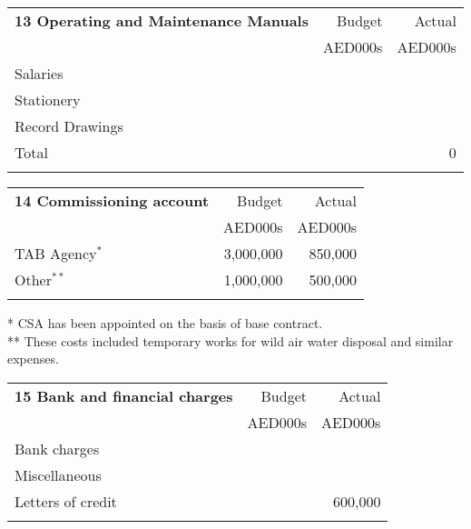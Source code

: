 \documentclass[oneside]{scrbook}
\makeatletter
\def\dotfill{%
\color{spot!50}%
\leavevmode
\cleaders \hb@xt@ 4pt{\hss \resizebox{1.5pt}{!}{\char"25CF}\relax\hss}\hfill
\kern\z@}%
\newcommand{\DotRow}[2]{%
\hbox to \columnwidth{\rule[-3pt]{0pt}{6pt}\dotfill}\break
}
\makeatother
\begin{document}
\begin{tabularx}{\linewidth}{Xrr}
\textbf{13 Operating and Maintenance Manuals }                                            &Budget   &Actual\\
                                                                               &AED000s &AED000s\\
\noalign{\DotRow{}{}} 
Salaries  &&\\
Stationery &&\\
Record Drawings &&\\
\noalign{\DotRow{}{}} 
Total   										&     &0 \\
\noalign{\DotRow{}{}} 
\end{tabularx}  
\bigskip\bigskip




\leavevmode
\noindent
\begin{tabularx}{\textwidth}{@{}Xrr@{}}
\textbf{14 Commissioning account}                                     &Budget   &Actual\\
                                                                                          &AED000s &AED000s\\
\noalign{\DotRow{}{}}                
TAB Agency$^*$												&3,000,000 & 850,000\\
Other$^{**}$                                                                                 &1,000,000 & 500,000\\
\noalign{\DotRow{}{}}  
\end{tabularx}

{\small
*  CSA has been appointed on the basis of base contract.\\
** These costs included temporary works for wild air water disposal and similar expenses.\\
}
\vspace*{1cm}


\begin{tabularx}{\textwidth}{@{}Xrr@{}}
\textbf{15 Bank and financial charges}                                     &Budget   &Actual\\
                                                                                              &AED000s &AED000s\\
\noalign{\DotRow{}{}}                                                            
 Bank charges                                                                         & &\\
 Miscellaneous                                                                        &&\\
 Letters of credit                                                                      & &600,000\\   
 \noalign{\DotRow{}{}}                     
\end{tabularx}                                                                                             
\end{document}
